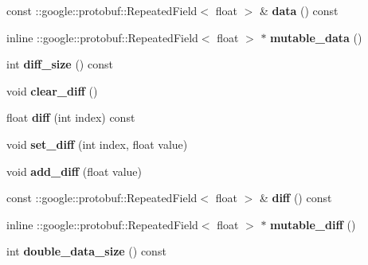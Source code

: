 \begin{DoxyCompactItemize}
const \+::google\+::protobuf\+::\+Repeated\+Field$<$ float $>$ \& {\bfseries data} () const
\item 
\mbox{\label{classcaffe_1_1_blob_proto_a2055f71e488bdabe4d346cd3c5843018}} 
inline \+::google\+::protobuf\+::\+Repeated\+Field$<$ float $>$ $\ast$ {\bfseries mutable\+\_\+data} ()
\item 
\mbox{\label{classcaffe_1_1_blob_proto_a0fd81c901f3ca51801add1249908be49}} 
int {\bfseries diff\+\_\+size} () const
\item 
\mbox{\label{classcaffe_1_1_blob_proto_a1d53c26cead4beb71888c69f83825ca8}} 
void {\bfseries clear\+\_\+diff} ()
\item 
\mbox{\label{classcaffe_1_1_blob_proto_ae0733a38738e6734fe527d4d33d17a2a}} 
float {\bfseries diff} (int index) const
\item 
\mbox{\label{classcaffe_1_1_blob_proto_ad9e8606f04e85d9f0464daa17431f2be}} 
void {\bfseries set\+\_\+diff} (int index, float value)
\item 
\mbox{\label{classcaffe_1_1_blob_proto_ae5cd593999b63420951668547058ebd9}} 
void {\bfseries add\+\_\+diff} (float value)
\item 
\mbox{\label{classcaffe_1_1_blob_proto_a5f27a83ca8de2de8b496d486ef59cec1}} 
const \+::google\+::protobuf\+::\+Repeated\+Field$<$ float $>$ \& {\bfseries diff} () const
\item 
\mbox{\label{classcaffe_1_1_blob_proto_a84c162b33be38b5aedfd2c6828de071e}} 
inline \+::google\+::protobuf\+::\+Repeated\+Field$<$ float $>$ $\ast$ {\bfseries mutable\+\_\+diff} ()
\item 
\mbox{\label{classcaffe_1_1_blob_proto_a3d5df825d37362106f54954cf8903a6e}} 
int {\bfseries double\+\_\+data\+\_\+size} () const
\item 
\mbox{\label{classcaffe_1_1_blob_proto_a80a5e7b7a6862b96ae3f440685f3f836}} 

\end{DoxyCompactItemize}
